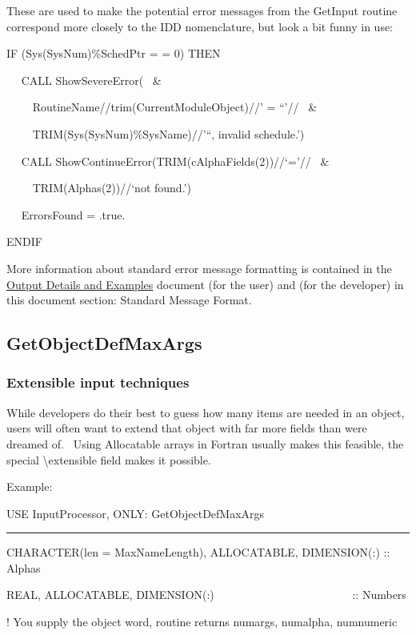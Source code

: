 These are used to make the potential error messages from the GetInput routine correspond more closely to the IDD nomenclature, but look a bit funny in use:

IF (Sys(SysNum)\%SchedPtr = = 0) THEN

~~ CALL ShowSevereError(~ \&

~~~~ RoutineName//trim(CurrentModuleObject)//' = ``'//~ \&

~~~~ TRIM(Sys(SysNum)\%SysName)//'``, invalid schedule.')

~~ CALL ShowContinueError(TRIM(cAlphaFields(2))//`='//~ \&

~~~~ TRIM(Alphas(2))//`not found.')

~~ ErrorsFound = .true.

ENDIF

More information about standard error message formatting is contained in the \href{https://energyplus.readthedocs.io/en/latest/guides/output-details-and-examples/index.html}{Output Details and Examples} document (for the user) and (for the developer) in this document section: Standard Message Format.

\subsection{GetObjectDefMaxArgs}\label{getobjectdefmaxargs}

\subsubsection{Extensible input techniques}\label{extensible-input-techniques}

While developers do their best to guess how many items are needed in an object, users will often want to extend that object with far more fields than were dreamed of.~ Using Allocatable arrays in Fortran usually makes this feasible, the special \textbackslash{}extensible field makes it possible.

Example:

USE InputProcessor, ONLY: GetObjectDefMaxArgs

\begin{center}\rule{0.5\linewidth}{0.4pt}\end{center}

CHARACTER(len = MaxNameLength), ALLOCATABLE, DIMENSION(:) :: Alphas

REAL, ALLOCATABLE, DIMENSION(:)~~~~~~~~~~~~~~~~~~~~~~~~ :: Numbers

! You supply the object word, routine returns numargs, numalpha, numnumeric

